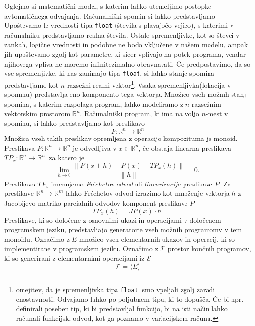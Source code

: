 \documentclass{article}
\newcommand{\RR}{\mathbb{R}}
\newcommand{\E}{\mathcal{E}}
\newcommand{\T}{\mathcal{T}}
\begin{document}
Oglejmo si matematični model, s katerim lahko utemeljimo postopke avtomatičnega
odvajanja. Računalniški spomin si lahko predstavljamo Upoštevamo le vrednosti
tipa \texttt{float} (števila s plavajočo vejico), s katerimi v računalniku
predstavljamo realna števila. Ostale spremenljivke, kot so števci v zankah, logične
vrednosti in podobne ne bodo vključene v našem modelu, ampak jih upoštevamo
zgolj kot parametre, ki sicer vplivajo na potek programa, vendar njihovega
vpliva ne moremo infinitezimalno obravnavati. Če predpostavimo, da so vse
spremenjivke, ki nas zanimajo tipa \texttt{float}, si lahko stanje spomina
predstavljamo kot $n$-razsežni realni vektor\footnote[1]{omejitev, da je
  spremenljivka tipa \texttt{float}, smo vpeljali zgolj zaradi enostavnosti.
  Odvajamo lahko po poljubnem tipu, ki to dopušča. Če bi npr. definirali
  poseben tip, ki bi predstavljal funkcijo, bi na isti način lahko računali
  funkcijski odvod, kot ga poznamo v variacijskem računu.}. Vsaka spremenljivka(lokacija v
spominu) predstavlja eno komponento tega vektorja. Množico vseh možnih stanj
spomina, s katerim razpolaga program, lahko modeliramo z $n$-razsežnim
vektorskim prostorom $\RR^n$.  Računalniški program, ki
ima na voljo $n$-mest v spominu, si lahko predstavljamo kot preslikavo
\begin{equation}
  \label{eq:program_kot_preslikava}
  P: \RR^n\to\RR^n
\end{equation}
Množica vseh takih preslikav opremljena z operacijo kompozituma je monoid.
Preslikava $P:\RR^n\to \RR^n$ je odvedljiva v $x\in\RR^n$, če obstaja linearna
preslikava $TP_x:\RR^n\to\RR^n$, za katero je 
\begin{equation}
  \label{eq:frechet}
  \lim_{h\to 0}\frac{\|P(x+h)-P(x)-TP_x(h)\|}{\|h\|} = 0.
\end{equation}
Preslikavo $TP_x$ imenujemo \emph{Fréchetov odvod} ali \emph{linearizacija}
preslikave $P$. Za preslikave $\RR^n\to \RR^m$ lahko Fréchetov odvod
izrazimo kot množenje vektorja $h$ z Jacobijevo matriko parcialnih odvodov
komponent preslikave $P$
\begin{equation*}
  TP_x(h) = JP(x)\cdot h.
\end{equation*}
Preslikave, ki so določene z osnovnimi ukazi in operacijami v določenem
programskem jeziku, predstavljajo generatorje vseh možnih programomv v tem
monoidu. Označimo z $E$ množico vseh elementarnih ukazov in operacij, ki so
implementirane v programskem jeziku. Označimo z $\T$ prostor končnih programov,
ki so generirani z elementarnimi operacijami iz $\E$
\begin{equation*}
  \T=\langle E \rangle
\end{equation*}
\end{document}
